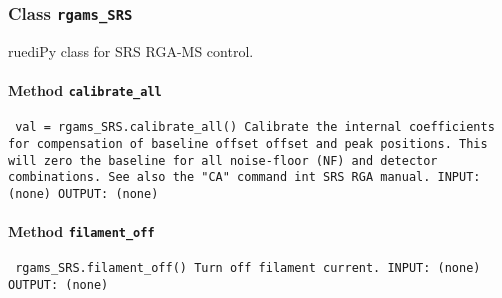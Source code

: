 
\subsubsection{Class \texttt{rgams_SRS}}
\par
ruediPy class for SRS RGA-MS control.\par

\paragraph{Method \texttt{calibrate_all}}
\vspace{1ex}
\texttt{\newline
val = rgams_SRS.calibrate_all()\newline
\newline
Calibrate the internal coefficients for compensation of baseline offset offset and peak positions. This will zero the baseline for all noise-floor (NF) and detector combinations. See also the "CA" command int SRS RGA manual.\newline
\newline
INPUT:\newline
(none)\newline
\newline
OUTPUT:\newline
(none)\newline
\newline
}

\paragraph{Method \texttt{filament_off}}
\vspace{1ex}
\texttt{\newline
rgams_SRS.filament_off()\newline
\newline
Turn off filament current.\newline
\newline
INPUT:\newline
(none)\newline
\newline
OUTPUT:\newline
(none)\newline
\newline
}

